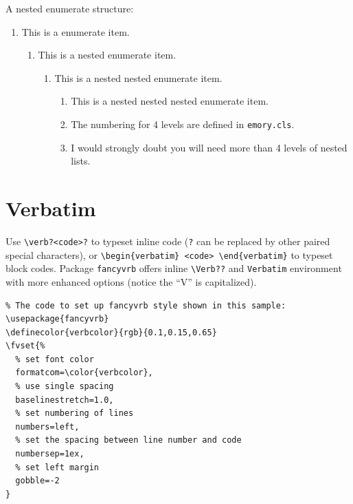 \documentclass[draft]{emory}
\begin{document}
A nested enumerate structure:
\begin{enumerate}
  \item This is a enumerate item.
  \begin{enumerate}
    \item This is a nested enumerate item.
    \begin{enumerate}
      \item This is a nested nested enumerate item.
      \begin{enumerate}
        \item This is a nested nested nested enumerate item. 
        \item The numbering for 4 levels are defined in \Verb|emory.cls|.
        \item I would strongly doubt you will need more than 4 levels of nested lists.
      \end{enumerate}
    \end{enumerate}
  \end{enumerate}    
\end{enumerate}

\section{Verbatim}

Use \Verb|\verb?<code>?| to typeset inline code  (\Verb|?| can be replaced by
other paired special characters),
or  \Verb|\begin{verbatim} <code> \end{verbatim}| to typeset block codes.
Package \Verb|fancyvrb| offers inline \Verb|\Verb??| and \Verb|Verbatim| environment with more enhanced
options (notice the ``V'' is capitalized).

\begin{Verbatim}
% The code to set up fancyvrb style shown in this sample:
\usepackage{fancyvrb}
\definecolor{verbcolor}{rgb}{0.1,0.15,0.65}
\fvset{%
  % set font color
  formatcom=\color{verbcolor},	
  % use single spacing
  baselinestretch=1.0,
  % set numbering of lines				  
  numbers=left,									
  % set the spacing between line number and code
  numbersep=1ex,
  % set left margin 							  
  gobble=-2											
}
\end{Verbatim}
\end{document}
